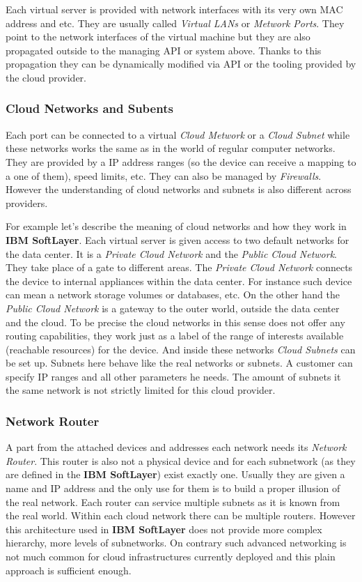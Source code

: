 Each virtual server is provided with network interfaces with its very own MAC address and etc. They are usually called \emph{Virtual LANs} or \emph{Metwork Ports}. They point to the network interfaces of the virtual machine but they are also propagated outside to the managing API or system above. Thanks to this propagation they can be dynamically modified via API or the tooling provided by the cloud provider.

\subsubsection{Cloud Networks and Subents}
\label{subs:Cloud Networks and Subents}

Each port can be connected to a virtual \emph{Cloud Metwork} or a \emph{Cloud Subnet} while these networks works the same as in the world of regular computer networks. They are provided by a IP address ranges (so the device can receive a mapping to a one of them), speed limits, etc. They can also be managed by \emph{Firewalls}. However the understanding of cloud networks and subnets is also different across providers.

For example let's describe the meaning of cloud networks and how they work in \textbf{IBM SoftLayer}. Each virtual server is given access to two default networks for the data center. It is a \emph{Private Cloud Network} and the \emph{Public Cloud Network}. They take place of a gate to different areas. The \emph{Private Cloud Network} connects the device to internal appliances within the data center. For instance such device can mean a network storage volumes or databases, etc. On the other hand the \emph{Public Cloud Network} is a gateway to the outer world, outside the data center and the cloud. To be precise the cloud networks in this sense does not offer any routing capabilities, they work just as a label of the range of interests available (reachable resources) for the device. And inside these networks \emph{Cloud Subnets} can be set up. Subnets here behave like the real networks or subnets. A customer can specify IP ranges and all other parameters he needs. The amount of subnets it the same network is not strictly limited for this cloud provider.

\subsubsection{Network Router}
\label{subs:Network Router}

A part from the attached devices and addresses each network needs its \emph{Network Router}. This router is also not a physical device and for each subnetwork (as they are defined in the \textbf{IBM SoftLayer}) exist exactly one. Usually they are given a name and IP address and the only use for them is to build a proper illusion of the real network. Each router can service multiple subnets as it is known from the real world. Within each cloud network there can be multiple routers. However this architecture used in \textbf{IBM SoftLayer} does not provide more complex hierarchy, more levels of subnetworks. On contrary such advanced networking is not much common for cloud infrastructures currently deployed and this plain approach is sufficient enough.

